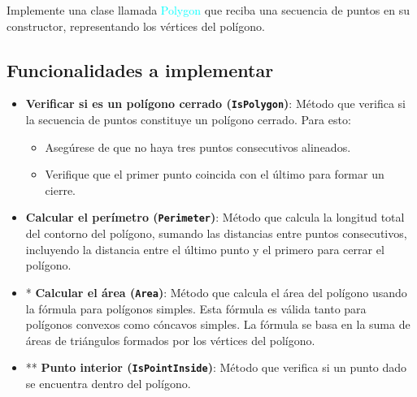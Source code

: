 Implemente una clase llamada \textcolor{cyan}{Polygon} que reciba una secuencia de puntos en su constructor, representando los vértices del polígono.

\subsection*{Funcionalidades a implementar}
\begin{itemize}
    \item \textbf{Verificar si es un polígono cerrado (\texttt{IsPolygon})}: 
    Método que verifica si la secuencia de puntos constituye un polígono cerrado. Para esto:
    \begin{itemize}
        \item Asegúrese de que no haya tres puntos consecutivos alineados.
        \item Verifique que el primer punto coincida con el último para formar un cierre.
    \end{itemize}
    
    \item \textbf{Calcular el perímetro (\texttt{Perimeter})}: 
    Método que calcula la longitud total del contorno del polígono, sumando las distancias entre puntos consecutivos, incluyendo la distancia entre el último punto y el primero para cerrar el polígono.
    
    \item * \textbf{Calcular el área (\texttt{Area})}: 
    Método que calcula el área del polígono usando la fórmula para polígonos simples. Esta fórmula es válida tanto para polígonos convexos como cóncavos simples. La fórmula se basa en la suma de áreas de triángulos formados por los vértices del polígono.

    \item ** \textbf{Punto interior (\texttt{IsPointInside})}: 
    Método que verifica si un punto dado se encuentra dentro del polígono.
\end{itemize}
